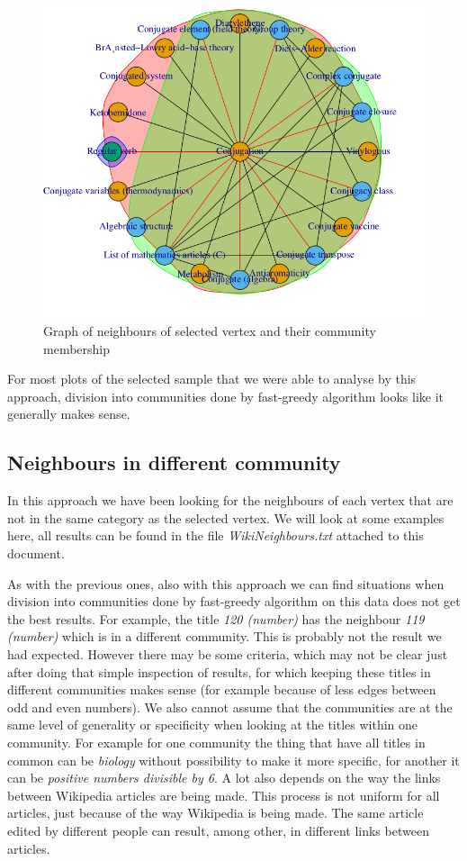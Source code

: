 \documentclass[paper=a4, fontsize=11pt]{scrartcl} %
\begin{document}
\begin{figure}
	\centering
	\includegraphics[scale=0.4,keepaspectratio]{Neighbours65}
	\caption{Graph of neighbours of selected vertex and their community membership}
	\label{Neighbours65}
\end{figure}

For most plots of the selected sample that we were able to analyse by this approach, division into communities done by fast-greedy algorithm looks like it generally makes sense. 

\subsection{Neighbours in different community}
In this approach we have been looking for the neighbours of each vertex that are not in the same category as the selected vertex. We will look at some examples here, all results can be found in the file \textit{WikiNeighbours.txt} attached to this document.

As with the previous ones, also with this approach we can find situations when division into communities done by fast-greedy algorithm on this data does not get the best results. For example, the title \textit{120 (number)} has the neighbour \textit{119 (number)} which is in a different community. This is probably not the result we had expected. However there may be some criteria, which may not be clear just after doing that simple inspection of results, for which keeping these titles in different communities makes sense (for example because of less edges between odd and even numbers). We also cannot assume that the communities are at the same level of generality or specificity when looking at the titles within one community. For example for one community the thing that have all titles in common can be \textit{biology} without possibility to make it more specific, for another it can be \textit{positive numbers divisible by 6}. A lot also depends on the way the links between Wikipedia articles are being made. This process is not uniform for all articles, just because of the way Wikipedia is being made. The same article edited by different people can result, among other, in different links between articles.
\end{document}
